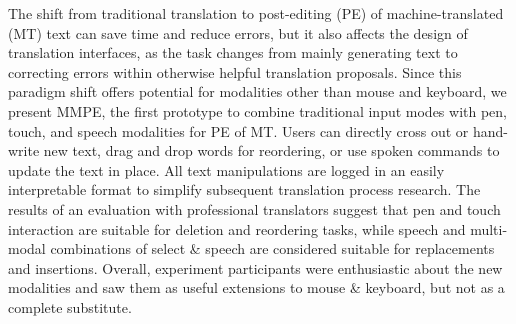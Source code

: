 The shift from traditional translation to post-editing (PE) of machine-translated (MT) text can save time and reduce errors, but it also affects the design of translation interfaces, as the task changes from mainly generating text to correcting errors within otherwise helpful translation proposals. Since this paradigm shift offers potential for modalities other than mouse and keyboard, we present MMPE, the first prototype to combine traditional input modes with pen, touch, and speech modalities for PE of MT. Users can directly cross out or hand-write new text, drag and drop words for reordering, or use spoken commands to update the text in place. All text manipulations are logged in an easily interpretable format to simplify subsequent translation process research. The results of an evaluation with professional translators suggest that pen and touch interaction are suitable for deletion and reordering tasks, while speech and multi-modal combinations of select \& speech are considered suitable for replacements and insertions. Overall, experiment participants were enthusiastic about the new modalities and saw them as useful extensions to mouse \& keyboard, but not as a complete substitute.
